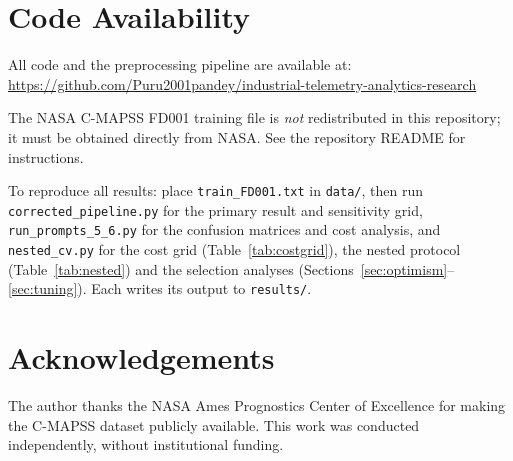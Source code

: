 \documentclass[10pt,twocolumn]{article}
\begin{document}
\section*{Code Availability}
All code and the preprocessing pipeline are available at:
\url{https://github.com/Puru2001pandey/industrial-telemetry-analytics-research}

\noindent The NASA C-MAPSS FD001 training file is \emph{not} redistributed in this
repository; it must be obtained directly from NASA. See the repository README for
instructions.

To reproduce all results: place \texttt{train\_FD001.txt} in \texttt{data/}, then run
\texttt{corrected\_pipeline.py} for the primary result and sensitivity grid,
\texttt{run\_prompts\_5\_6.py} for the confusion matrices and cost analysis, and
\texttt{nested\_cv.py} for the cost grid (Table~\ref{tab:costgrid}), the nested
protocol (Table~\ref{tab:nested}) and the selection analyses
(Sections~\ref{sec:optimism}--\ref{sec:tuning}). Each writes its output to
\texttt{results/}.

\section*{Acknowledgements}
The author thanks the NASA Ames Prognostics Center of Excellence for making the
C-MAPSS dataset publicly available.
This work was conducted independently, without institutional funding.
\end{document}
